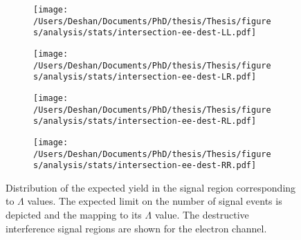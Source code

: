 \begin{figure}[h!]
    \centering
    \begin{subfigure}[b]{0.49\textwidth}
        \centering
        \texttt{[image: /Users/Deshan/Documents/PhD/thesis/Thesis/figures/analysis/stats/intersection-ee-dest-LL.pdf]}
        \label{fig:bkgmodel:interpee5}
    \end{subfigure}
    \begin{subfigure}[b]{0.49\textwidth}
        \centering
        \texttt{[image: /Users/Deshan/Documents/PhD/thesis/Thesis/figures/analysis/stats/intersection-ee-dest-LR.pdf]}
        \label{fig:bkgmodel:interpee6}
    \end{subfigure}
    \begin{subfigure}[b]{0.49\textwidth}
        \centering
        \texttt{[image: /Users/Deshan/Documents/PhD/thesis/Thesis/figures/analysis/stats/intersection-ee-dest-RL.pdf]}
        \label{fig:bkgmodel:interpee7}
    \end{subfigure}
    \begin{subfigure}[b]{0.49\textwidth}
        \centering
        \texttt{[image: /Users/Deshan/Documents/PhD/thesis/Thesis/figures/analysis/stats/intersection-ee-dest-RR.pdf]}
        \label{fig:bkgmodel:interpee8}
    \end{subfigure}
    \caption{Distribution of the expected yield in the signal region corresponding to $\Lambda$ values. The expected limit on the number of signal events is depicted and the mapping to its $\Lambda$ value. The destructive interference signal regions are shown for the electron channel.}
    \label{fig:stats:interpeedest}
\end{figure}

